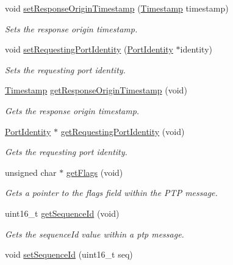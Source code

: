 \begin{DoxyCompactItemize}
void \hyperlink{class_p_t_p_message_path_delay_resp_follow_up_a0d243478d031d7ad9127a825ba8a321c}{set\+Response\+Origin\+Timestamp} (\hyperlink{class_timestamp}{Timestamp} timestamp)
\begin{DoxyCompactList}\small\item\em Sets the response origin timestamp. \end{DoxyCompactList}\item 
void \hyperlink{class_p_t_p_message_path_delay_resp_follow_up_a8a5973763e2ea58d2aaf9cfc8ca8456b}{set\+Requesting\+Port\+Identity} (\hyperlink{class_port_identity}{Port\+Identity} $\ast$identity)
\begin{DoxyCompactList}\small\item\em Sets the requesting port identity. \end{DoxyCompactList}\item 
\hyperlink{class_timestamp}{Timestamp} \hyperlink{class_p_t_p_message_path_delay_resp_follow_up_ac0d05a353c03d9047e62a1e6745075af}{get\+Response\+Origin\+Timestamp} (void)
\begin{DoxyCompactList}\small\item\em Gets the response origin timestamp. \end{DoxyCompactList}\item 
\hyperlink{class_port_identity}{Port\+Identity} $\ast$ \hyperlink{class_p_t_p_message_path_delay_resp_follow_up_a2e8b32e7d90de638aeb1220a8ec2b489}{get\+Requesting\+Port\+Identity} (void)
\begin{DoxyCompactList}\small\item\em Gets the requesting port identity. \end{DoxyCompactList}\item 
unsigned char $\ast$ \hyperlink{class_p_t_p_message_common_aa75ce7cb63073d090a15ca2c28b6819a}{get\+Flags} (void)
\begin{DoxyCompactList}\small\item\em Gets a pointer to the flags field within the P\+TP message. \end{DoxyCompactList}\item 
uint16\+\_\+t \hyperlink{class_p_t_p_message_common_abd5cac5701120cbbfc56129b31fa801f}{get\+Sequence\+Id} (void)
\begin{DoxyCompactList}\small\item\em Gets the sequence\+Id value within a ptp message. \end{DoxyCompactList}\item 
void \hyperlink{class_p_t_p_message_common_a7fc215800bddc8a39e50e463ffbe651a}{set\+Sequence\+Id} (uint16\+\_\+t seq)

\end{DoxyCompactItemize}
